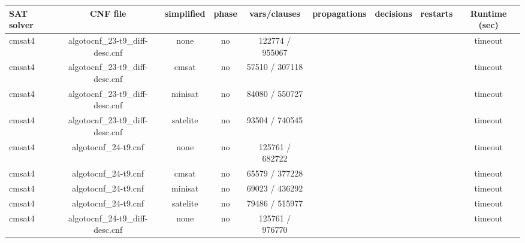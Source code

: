 \begin{appendices}
\begin{table}[p]
  \begin{center}
    \begin{tabular}{l|cccccccc}
        \textbf{SAT solver} & \textbf{CNF file} & \textbf{simplified} & \textbf{phase} & \textbf{vars/clauses} & \textbf{propagations} & \textbf{decisions} & \textbf{restarts} & \textbf{Runtime (sec)} \\
      \hline
  cmsat4                         & algotocnf\_23-t9\_diff-desc.cnf & none       & no    & 122774 / 955067 &           &           &            & timeout \\ %
  cmsat4                         & algotocnf\_23-t9\_diff-desc.cnf & cmsat      & no    & 57510 / 307118 &           &           &            & timeout \\ %
  cmsat4                         & algotocnf\_23-t9\_diff-desc.cnf & minisat    & no    & 84080 / 550727 &           &           &            & timeout \\ %
  cmsat4                         & algotocnf\_23-t9\_diff-desc.cnf & satelite   & no    & 93504 / 740545 &           &           &            & timeout \\ %
  cmsat4                         & algotocnf\_24-t9.cnf           & none       & no    & 125761 / 682722 &           &           &            & timeout \\ %
  cmsat4                         & algotocnf\_24-t9.cnf           & cmsat      & no    & 65579 / 377228 &           &           &            & timeout \\ %
  cmsat4                         & algotocnf\_24-t9.cnf           & minisat    & no    & 69023 / 436292 &           &           &            & timeout \\ %
  cmsat4                         & algotocnf\_24-t9.cnf           & satelite   & no    & 79486 / 515977 &           &           &            & timeout \\ %
  cmsat4                         & algotocnf\_24-t9\_diff-desc.cnf & none       & no    & 125761 / 976770 &           &           &            & timeout \\ %

\end{tabular}
\end{center}
\end{table}
\end{appendices}
